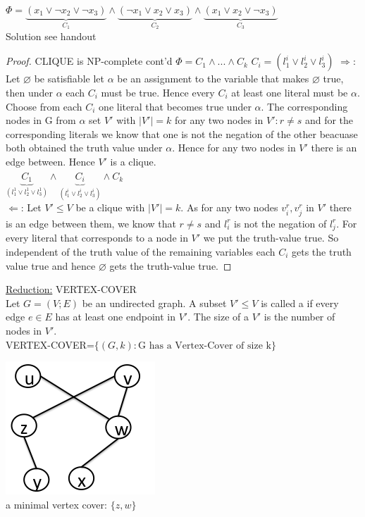 \begin{example}
  $\Phi = \underbrace{( x_{1} \vee \lnot x_{2} \vee \lnot x_{3})}_{C_{1}} \wedge  \underbrace{( \lnot x_{1} \vee x_{2} \vee x_{3})}_{C_{2}} \wedge  \underbrace{( x_{1} \vee x_{2} \vee \lnot x_{3})}_{C_{3}} $ \\
  Solution see handout
\end{example}  

\begin{proof}{CLIQUE is NP-complete cont'd}
   $\Phi = C_{1} \wedge ... \wedge C_{k}$ $C_{i} = (l_{1}^i \vee l_{2}^i \vee l_{3}^i )$
   $\Rightarrow$: Let $\varnothing$ be satisfiable let $\alpha$ be an assignment to the variable that makes $\varnothing$ true, then under $\alpha$ each $C_{i}$ must be true. Hence every $C_{i}$ at least one literal must be $\alpha$. Choose from each $C_{i}$ one literal that becomes true under $\alpha$. The corresponding nodes in G from $\alpha$ set $V'$ with $\left| V' \right| = k$ for any two nodes in $V': r \neq s$ and for the corresponding literals we know that one is not the negation of the other beacuase both obtained the truth value under $\alpha$. Hence for any two nodes in $V'$ there is an edge between. Hence $V'$ is a clique. \\
   $\underbrace{C_{1}}_{(l_{1}^1 \vee l_{2}^1 \vee l_{3}^1 )} \wedge \underbrace{C_{i}}_{(l_{1}^i \vee l_{2}^i \vee l_{3}^i )} \wedge C_{k}$\\
   $\Leftarrow$: Let $V' \leq V$ be a clique with $\left| V' \right| = k$. As for any two nodes $v_{i}^r, v_{j}^r$ in $V'$ there is an edge between them, we know that $r \neq s$ and $l_{i}^r$ is not the negation of $l_{j}^r$. For every literal that corresponds to a node in $V'$ we put the truth-value true. So independent of the truth value of the remaining variables each $C_{i}$ gets the truth value true and hence $\varnothing$ gets the truth-value true.
\end{proof}

\vspace{0.5cm}
\underline{Reduction:} VERTEX-COVER \\
Let $G=(V;E)$ be an undirected graph. A subset $V' \leq V$ is called a  if every edge $e \in E$ has at least one endpoint in $V'$. The size of a  $V'$ is the number of nodes in $V'$. \\
VERTEX-COVER=$\{ (G,k) : \text{G has a Vertex-Cover of size k} \}$
\begin{example}
  \includegraphics[scale=0.5]{diagrams/vertex_cover}\\
  a minimal vertex cover: $\{ z,w \}$
\end{example}

